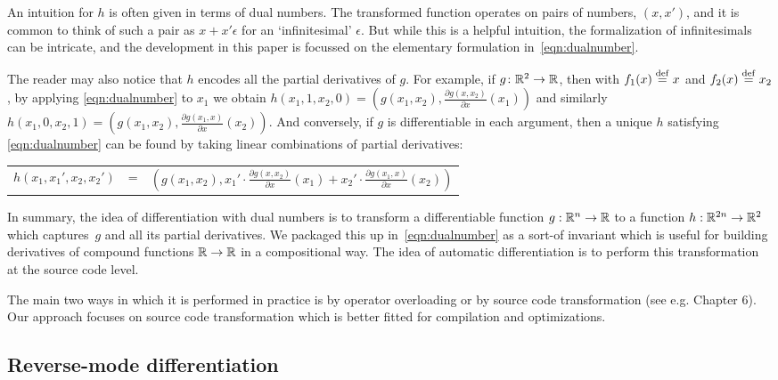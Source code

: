 An intuition for $h$ is often given in terms of dual numbers.
The transformed function operates on pairs of numbers, $(x,x')$, and it is common
to think of such a pair as $x+x'\epsilon$ for an `infinitesimal' $\epsilon$.
But while this is a helpful intuition, the formalization of infinitesimals can be intricate, 
and the development in this paper is focussed on the elementary formulation in~\eqref{eqn:dualnumber}. 

The reader may also notice that $h$ encodes all the partial derivatives of
$g$. For example, 
if $g \colon \mathbb{R}^2\to \mathbb{R}$, then with $f_1(x)\stackrel {\mathrm{def}}= x$ and $f_2(x)\stackrel {\mathrm{def}}= x_2$, by applying \eqref{eqn:dualnumber} to $x_1$ we obtain
$h(x_1,1,x_2,0)=(g(x_1,x_2), \frac {\partial g(x,x_2)}{\partial x}(x_1))$
and similarly 
$h(x_1,0,x_2,1)=(g(x_1,x_2), \frac {\partial g(x_1,x)}{\partial x}(x_2))$.
And conversely, if $g$ is differentiable in each argument, then
a unique $h$ satisfying \eqref{eqn:dualnumber} can be found by taking linear
combinations of partial derivatives:

\begin{center}
    \begin{tabular}{r c l}
        $h(x_1,x_1',x_2,x_2')$ &= & $(g(x_1,x_2),x_1' \cdot\frac {\partial g(x,x_2)}{\partial x}(x_1)+x_2'\cdot \frac {\partial g(x_1,x)}{\partial x}(x_2))$
    \end{tabular}
\end{center}

In summary, the idea of differentiation with dual numbers is 
to transform a differentiable function
$g:\mathbb{R}^n\to \mathbb{R}$ to a function $h:\mathbb{R}^{2n}\to \mathbb{R}^2$ which captures~$g$ and all its partial derivatives. We packaged this up in~\eqref{eqn:dualnumber} as a sort-of invariant which is useful for building derivatives of compound functions $\mathbb{R}\to\mathbb{R}$ in a compositional way.
The idea of automatic differentiation is to perform this transformation at the source code level. 

The main two ways in which it is performed in practice is by operator overloading or by source code transformation (see e.g. \cite{griewank2008evaluating} Chapter 6). 
Our approach focuses on source code transformation which is better fitted for compilation and optimizations.

\subsection{Reverse-mode differentiation}

